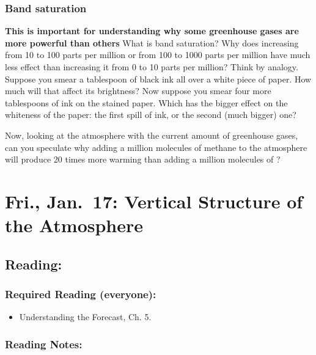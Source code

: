 \documentclass[
]{article}
\providecommand{\tightlist}{%
  \setlength{\itemsep}{0pt}\setlength{\parskip}{0pt}}
\newcommand{\COO}{\ce{CO2}}
\begin{document}
\hypertarget{band-saturation}{%
\subsubsection{Band saturation}\label{band-saturation}}

\textbf{This is important for understanding why some greenhouse gases
are more powerful than others} What is band saturation? Why does
increasing \COO{} from 10 to 100 parts per million or from 100 to 1000
parts per million have much less effect than increasing it from 0 to 10
parts per million? Think by analogy. Suppose you smear a tablespoon of
black ink all over a white piece of paper. How much will that affect its
brightness? Now suppose you smear four more tablespoons of ink on the
stained paper. Which has the bigger effect on the whiteness of the
paper: the first spill of ink, or the second (much bigger) one?

Now, looking at the atmosphere with the current amount of greenhouse
gases, can you speculate why adding a million molecules of methane to
the atmosphere will produce 20 times more warming than adding a million
molecules of \COO{}?

\hypertarget{fri.-jan.-17-vertical-structure-of-the-atmosphere}{%
\section{Fri., Jan.~17: Vertical Structure of the
Atmosphere}\label{fri.-jan.-17-vertical-structure-of-the-atmosphere}}

\hypertarget{reading-5}{%
\subsection{Reading:}\label{reading-5}}

\hypertarget{required-reading-everyone-4}{%
\subsubsection{Required Reading
(everyone):}\label{required-reading-everyone-4}}

\begin{itemize}
\tightlist
\item
  Understanding the Forecast, Ch. 5.
\end{itemize}

\hypertarget{reading-notes-4}{%
\subsubsection{Reading Notes:}\label{reading-notes-4}}
\end{document}
